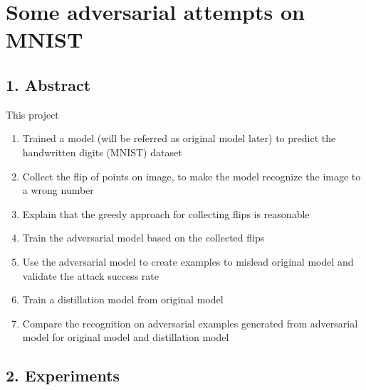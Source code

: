\documentclass[
]{article}
\author{}
\date{}
\providecommand{\tightlist}{%
  \setlength{\itemsep}{0pt}\setlength{\parskip}{0pt}}
\begin{document}
\hypertarget{some-adversarial-attempts-on-mnist}{%
\section{Some adversarial attempts on
MNIST}\label{some-adversarial-attempts-on-mnist}}

\hypertarget{abstract}{%
\subsection{1. Abstract}\label{abstract}}

This project

\begin{enumerate}
\def\labelenumi{\arabic{enumi}.}
\tightlist
\item
  Trained a model (will be referred as original model later) to predict
  the handwritten digits (MNIST) dataset
\item
  Collect the flip of points on image, to make the model recognize the
  image to a wrong number
\item
  Explain that the greedy approach for collecting flips is reasonable
\item
  Train the adversarial model based on the collected flips
\item
  Use the adversarial model to create examples to mislead original model
  and validate the attack success rate
\item
  Train a distillation model from original model
\item
  Compare the recognition on adversarial examples generated from
  adversarial model for original model and distillation model
\end{enumerate}

\hypertarget{Experiments}{%
\subsection{2. Experiments}\label{design-of-experiment}}
\end{document}
